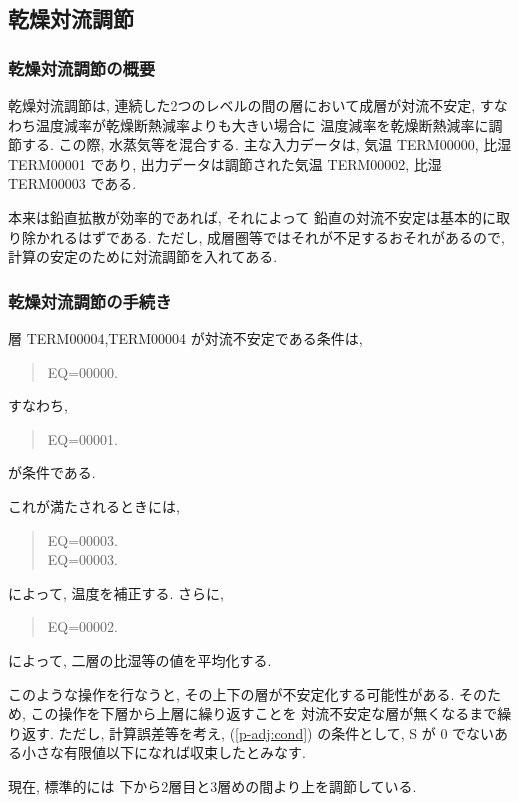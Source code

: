 ﻿
\subsection{乾燥対流調節}

\subsubsection{乾燥対流調節の概要}

乾燥対流調節は, 
連続した2つのレベルの間の層において成層が対流不安定, 
すなわち温度減率が乾燥断熱減率よりも大きい場合に
温度減率を乾燥断熱減率に調節する. この際, 水蒸気等を混合する.
主な入力データは, 気温 TERM00000, 比湿 TERM00001 であり,
出力データは調節された気温 TERM00002, 比湿 TERM00003 である.

本来は鉛直拡散が効率的であれば, それによって
鉛直の対流不安定は基本的に取り除かれるはずである.
ただし, 成層圏等ではそれが不足するおそれがあるので,
計算の安定のために対流調節を入れてある.

\subsubsection{乾燥対流調節の手続き}

層 TERM00004,TERM00004 が対流不安定である条件は,
%
\begin{quote}
EQ=00000.
\end{quote}
%
すなわち,
\begin{quote}
EQ=00001.
\label{p-adj:cond}
\end{quote}
が条件である.

これが満たされるときには,
\begin{quote}
EQ=00003.\\
EQ=00003.
\end{quote}
によって, 温度を補正する.
さらに,
\begin{quote}
EQ=00002.
\end{quote}
によって, 二層の比湿等の値を平均化する.

このような操作を行なうと,
その上下の層が不安定化する可能性がある. そのため,
この操作を下層から上層に繰り返すことを
対流不安定な層が無くなるまで繰り返す.
ただし, 計算誤差等を考え, 
(\ref{p-adj:cond}) の条件として,
S が 0 でないある小さな有限値以下になれば収束したとみなす.

現在, 標準的には 下から2層目と3層めの間より上を調節している.

